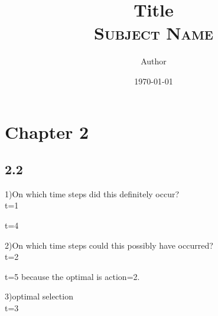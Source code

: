 \documentclass[answers]{exam}
\title{\Huge{Title}
	\\
\Large\scshape{Subject Name}}
\author{Author}
\date{\today}
\theoremstyle{definition}
\theoremstyle{remark}
\begin{document}
\section{Chapter 2}



\subsection{2.2}

1)On which time steps did this definitely occur?\\
t=1 

t=4


2)On which time steps could this possibly have occurred?\\
t=2

t=5
because the optimal is action=2.

3)optimal selection\\

t=3 
\end{document}
